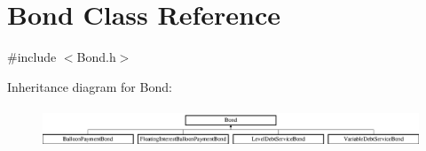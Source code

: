 \hypertarget{classBond}{}\section{Bond Class Reference}
\label{classBond}


{\ttfamily \#include $<$Bond.\+h$>$}

Inheritance diagram for Bond\+:\begin{figure}[H]
\begin{center}
\leavevmode
\includegraphics[height=1.244444cm]{classBond}
\end{center}
\end{figure}
